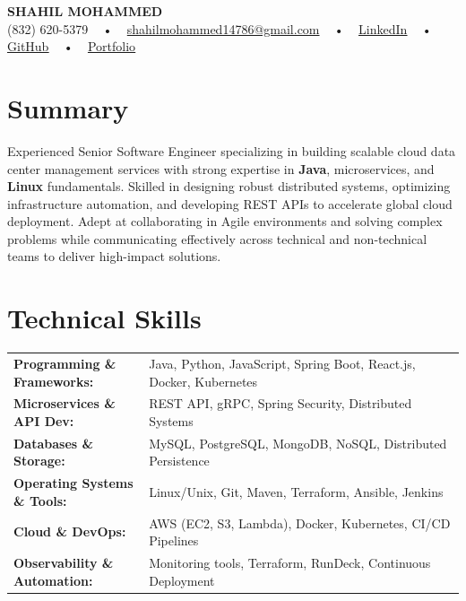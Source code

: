 \documentclass[letterpaper,11pt]{article}
\begin{document}
\begin{center}
    {\fontsize{14pt}{12pt}\selectfont \textbf{\MakeUppercase{Shahil Mohammed}}}\\ \vspace{2pt}
    \fontsize{10pt}{12pt}\selectfont (832) 620-5379 ~ • ~ \href{mailto:shahilmohammed14786@gmail.com}{shahilmohammed14786@gmail.com} ~ • ~  
    \href{https://www.linkedin.com/in/shahil-mohammed-9652931a1/}{\color{blue}\underline{LinkedIn}}  ~ • ~ 
    \href{https://github.com/freakbeast14}{\color{blue}\underline{GitHub}} ~ • ~ 
    \href{https://shahil-mohammed.netlify.app/}{\color{blue}\underline{Portfolio}}
    \vspace{-8pt}
\end{center}

\section{Summary}
\fontsize{9pt}{10pt}\selectfont
Experienced Senior Software Engineer specializing in building scalable cloud data center management services with strong expertise in \textbf{Java}, microservices, and \textbf{Linux} fundamentals. Skilled in designing robust distributed systems, optimizing infrastructure automation, and developing REST APIs to accelerate global cloud deployment. Adept at collaborating in Agile environments and solving complex problems while communicating effectively across technical and non-technical teams to deliver high-impact solutions.
 \vspace{-5pt}
 
\section{Technical Skills}
        \vspace{-14pt}
        \begin{table}[h]
            \fontsize{9pt}{10pt}\selectfont
            \begin{tabular}{p{0.3\linewidth} p{0.7\linewidth}}
                \textbf{Programming \& Frameworks:} & Java, Python, JavaScript, Spring Boot, React.js, Docker, Kubernetes \\
                \textbf{Microservices \& API Dev:} & REST API, gRPC, Spring Security, Distributed Systems \\
                \textbf{Databases \& Storage:} & MySQL, PostgreSQL, MongoDB, NoSQL, Distributed Persistence \\
                \textbf{Operating Systems \& Tools:} & Linux/Unix, Git, Maven, Terraform, Ansible, Jenkins \\
                \textbf{Cloud \& DevOps:} & AWS (EC2, S3, Lambda), Docker, Kubernetes, CI/CD Pipelines \\
                \textbf{Observability \& Automation:} & Monitoring tools, Terraform, RunDeck, Continuous Deployment \\
            \end{tabular}
        \end{table}
 \vspace{-15pt}
 
\end{document}

